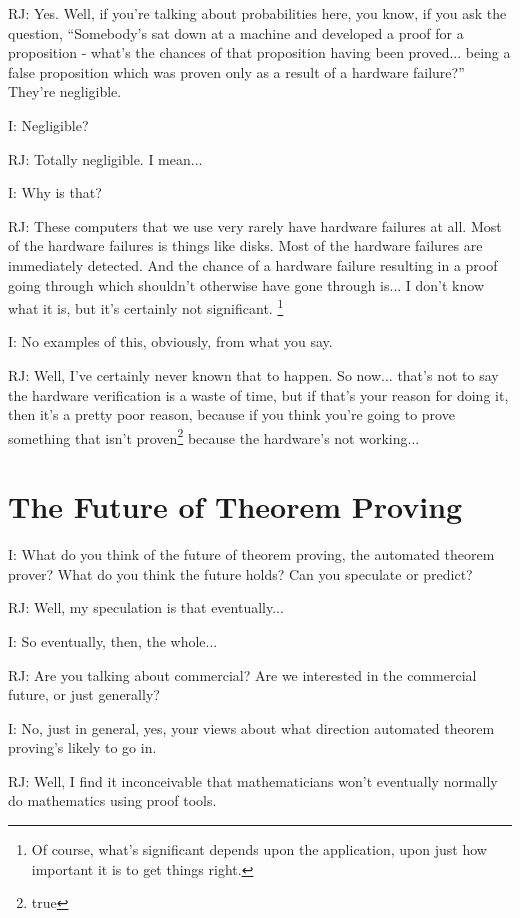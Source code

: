 \documentclass[10pt,titlepage]{book}
\begin{document}
RJ: Yes.
Well, if you're talking about probabilities here, you know, if you ask the question, ``Somebody's sat down at a machine and developed a proof for a proposition - what's the chances of that proposition having been proved... being a false proposition which was proven only as a result of a hardware failure?''
They're negligible.

I: Negligible?

RJ: Totally negligible.
I mean...

I: Why is that?

RJ: These computers that we use very rarely have hardware failures at all.
Most of the hardware failures is things like disks.
Most of the hardware failures are immediately detected.
And the chance of a hardware failure resulting in a proof going through which shouldn't otherwise have gone through is...  I don't know what it is, but it's certainly not significant.%
\footnote{
Of course, what's significant depends upon the application, upon just how important it is to get things right.
}

I: No examples of this, obviously, from what you say.

RJ: Well, I've certainly never known that to happen.
So now... that's not to say the hardware verification is a waste of time, but if that's your reason for doing it, then it's a pretty poor reason, because if you think you're going to prove something that isn't proven\footnote{true} because the hardware's not working...

\section{The Future of Theorem Proving}

I: What do you think of the future of theorem proving, the automated theorem prover?
What do you think the future holds?
Can you speculate or predict?

RJ: Well, my speculation is that eventually...

I: So eventually, then, the whole...

RJ: Are you talking about commercial?
Are we interested in the commercial future, or just generally?

I: No, just in general, yes, your views about what direction automated theorem proving's likely to go in.

RJ: Well, I find it inconceivable that mathematicians won't eventually normally do mathematics using proof tools.
\end{document}
